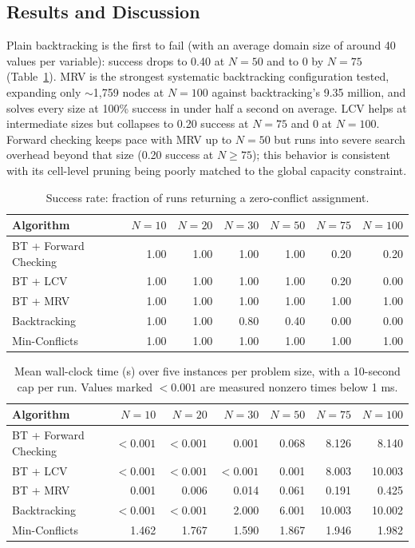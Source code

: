 \documentclass{ai-lab-report}
\begin{document}
\subsection{Results and Discussion}

Plain backtracking is the first to fail (with an average domain size of around 40 values per variable): success drops to 0.40 at $N=50$ and to 0 by $N=75$ (Table~\ref{tab:a2-success}). MRV is the strongest systematic backtracking configuration tested, expanding only $\sim$1,759 nodes at $N=100$ against backtracking's 9.35 million, and solves every size at 100\% success in under half a second on average. LCV helps at intermediate sizes but collapses to 0.20 success at $N=75$ and 0 at $N=100$. Forward checking keeps pace with MRV up to $N=50$ but runs into severe search overhead beyond that size (0.20 success at $N\ge75$); this behavior is consistent with its cell-level pruning being poorly matched to the global capacity constraint.

\begin{table}[H]
\centering
\small
\caption{Success rate: fraction of runs returning a zero-conflict assignment.}
\label{tab:a2-success}
\begin{tabular}{lrrrrrr}
\toprule
Algorithm & $N=10$ & $N=20$ & $N=30$ & $N=50$ & $N=75$ & $N=100$ \\
\midrule
BT + Forward Checking & 1.00 & 1.00 & 1.00 & 1.00 & 0.20 & 0.20 \\
BT + LCV & 1.00 & 1.00 & 1.00 & 1.00 & 0.20 & 0.00 \\
BT + MRV & 1.00 & 1.00 & 1.00 & 1.00 & 1.00 & 1.00 \\
Backtracking & 1.00 & 1.00 & 0.80 & 0.40 & 0.00 & 0.00 \\
Min-Conflicts & 1.00 & 1.00 & 1.00 & 1.00 & 1.00 & 1.00 \\
\bottomrule
\end{tabular}
\end{table}

\begin{table}[H]
\centering
\small
\caption{Mean wall-clock time (s) over five instances per problem size, with a 10-second cap per run. Values marked $<0.001$ are measured nonzero times below 1 ms.}
\label{tab:a2-runtime}
\begin{tabular}{lrrrrrr}
\toprule
Algorithm & $N=10$ & $N=20$ & $N=30$ & $N=50$ & $N=75$ & $N=100$ \\
\midrule
BT + Forward Checking & $<0.001$ & $<0.001$ & 0.001 & 0.068 & 8.126 & 8.140 \\
BT + LCV & $<0.001$ & $<0.001$ & $<0.001$ & 0.001 & 8.003 & 10.003 \\
BT + MRV & 0.001 & 0.006 & 0.014 & 0.061 & 0.191 & 0.425 \\
Backtracking & $<0.001$ & $<0.001$ & 2.000 & 6.001 & 10.003 & 10.002 \\
Min-Conflicts & 1.462 & 1.767 & 1.590 & 1.867 & 1.946 & 1.982 \\
\bottomrule
\end{tabular}
\end{table}
\end{document}
